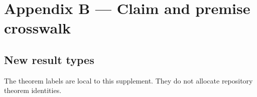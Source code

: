 \documentclass[11pt,a4paper]{article}
\begin{document}
\clearpage

\section*{Appendix B --- Claim and premise
crosswalk}\label{appendix-b-claim-and-premise-crosswalk}

\subsection*{New result types}\label{new-result-types}

The theorem labels are local to this supplement. They do not allocate
repository theorem identities.
\end{document}
